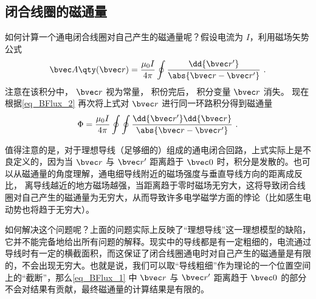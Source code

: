 \subsection{闭合线圈的磁通量}
如何计算一个通电闭合线圈对自己产生的磁通量呢？假设电流为 $I$，利用磁场矢势公式
\begin{equation}
\bvec A \qty(\bvec r) = \frac{\mu_0 I}{4 \pi} \oint \frac{\dd{\bvec r'}}{\abs{\bvec r - \bvec r'}}~.
\end{equation}
注意在该积分中， $\bvec r$ 视为常量， 积份完后， 积分变量 $\bvec r$ 消失。 现在根据\autoref{eq_BFlux_2} 再次将上式对 $\bvec r$ 进行同一环路积分得到磁通量
\begin{equation}\label{eq_BFlux_1}
\Phi  = \frac{\mu_0 I}{4\pi} \oint\oint \frac{\dd{\bvec r'} \dd{\bvec r}}{\abs{\bvec r - \bvec r'}}~.
\end{equation}

值得注意的是，对于理想导线（足够细的）组成的通电闭合回路，上式实际上是不良定义的，因为当 $\bvec r$ 与 $\bvec r'$ 距离趋于 $\bvec 0$ 时，积分是发散的。也可以从磁通量的角度理解，通电细导线附近的磁场强度与垂直导线方向的距离成反比，%
离导线越近的地方磁场越强，当距离趋于零时磁场无穷大，这将导致闭合线圈对自己产生的磁通量为无穷大，从而导致许多电学磁学方面的悖论（比如感生电动势也将趋于无穷大）。

如何解决这个问题呢？上面的问题实际上反映了“理想导线”这一理想模型的缺陷，它并不能完备地给出所有问题的解释。现实中的导线都是有一定粗细的，电流通过导线时有一定的横截面积，而这保证了闭合线圈通电时对自己产生的磁通量是有限的，不会出现无穷大。也就是说，我们可以取“导线粗细”作为理论的一个位置空间上的“截断”，那么\autoref{eq_BFlux_1} 中 $\bvec r$ 与 $\bvec r'$ 距离趋于 $\bvec 0$ 的部分不会对结果有贡献，最终磁通量的计算结果是有限的。
